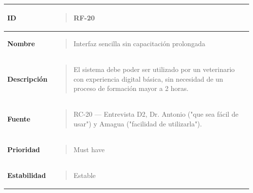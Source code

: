 \documentclass[
]{article}
\newcounter{none} %
\begin{document}
{\def\LTcaptype{none} %
\begin{longtable}[]{@{}
  >{\raggedright\arraybackslash}p{}
  >{\raggedright\arraybackslash}p{}@{}}
\toprule\noalign{}
\begin{minipage}[b]{\linewidth}\raggedright
\textbf{ID}
\end{minipage} & \begin{minipage}[b]{\linewidth}\raggedright
\begin{quote}
RF-20
\end{quote}
\end{minipage} \\
\midrule\noalign{}
\endhead
\bottomrule\noalign{}
\endlastfoot
\textbf{Nombre} & \begin{minipage}[t]{\linewidth}\raggedright
\begin{quote}
Interfaz sencilla sin capacitación prolongada
\end{quote}
\end{minipage} \\
\textbf{Descripción} & \begin{minipage}[t]{\linewidth}\raggedright
\begin{quote}
El sistema debe poder ser utilizado por un veterinario con experiencia
digital básica, sin necesidad de un proceso de formación mayor a 2
horas.
\end{quote}
\end{minipage} \\
\textbf{Fuente} & \begin{minipage}[t]{\linewidth}\raggedright
\begin{quote}
RC-20 --- Entrevista D2, Dr. Antonio ("que sea fácil de usar") y Amagua
("facilidad de utilizarla").
\end{quote}
\end{minipage} \\
\textbf{Prioridad} & \begin{minipage}[t]{\linewidth}\raggedright
\begin{quote}
Must have
\end{quote}
\end{minipage} \\
\textbf{Estabilidad} & \begin{minipage}[t]{\linewidth}\raggedright
\begin{quote}
Estable
\end{quote}
\end{minipage} \\

\end{longtable}}
\end{document}
